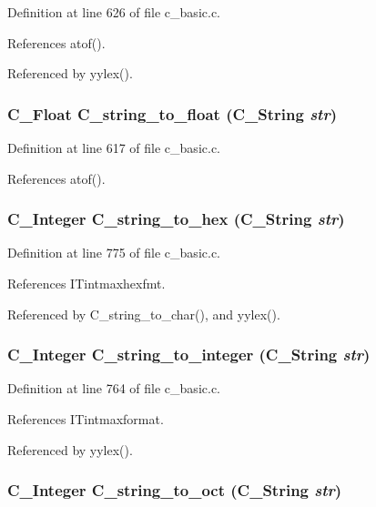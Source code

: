 Definition at line 626 of file c\_\-basic.c.

References atof().

Referenced by yylex().
\subsubsection{\setlength{\rightskip}{0pt plus 5cm}\bf{C\_\-Float} C\_\-string\_\-to\_\-float (\bf{C\_\-String} {\em str})}\label{c__basic_8h_1e26562297d5d2d8dfc6d064c0f4bb97}




Definition at line 617 of file c\_\-basic.c.

References atof().
\subsubsection{\setlength{\rightskip}{0pt plus 5cm}\bf{C\_\-Integer} C\_\-string\_\-to\_\-hex (\bf{C\_\-String} {\em str})}\label{c__basic_8h_cad7f70163dc04f98d91731fe502cfca}




Definition at line 775 of file c\_\-basic.c.

References ITintmaxhexfmt.

Referenced by C\_\-string\_\-to\_\-char(), and yylex().
\subsubsection{\setlength{\rightskip}{0pt plus 5cm}\bf{C\_\-Integer} C\_\-string\_\-to\_\-integer (\bf{C\_\-String} {\em str})}\label{c__basic_8h_2e16bcbe168d5f7c18ffe89ed3e70a6d}




Definition at line 764 of file c\_\-basic.c.

References ITintmaxformat.

Referenced by yylex().
\subsubsection{\setlength{\rightskip}{0pt plus 5cm}\bf{C\_\-Integer} C\_\-string\_\-to\_\-oct (\bf{C\_\-String} {\em str})}\label{c__basic_8h_8ecc0dc21731d12b5531491d2a5edbfc}




